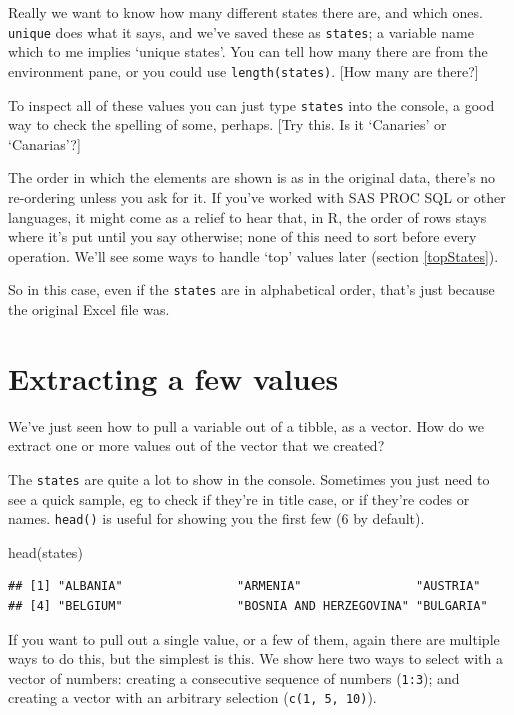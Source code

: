 \documentclass[
]{book}
\newenvironment{Shaded}{\begin{snugshade}}{\end{snugshade}}
\newcommand{\FunctionTok}[1]{\textcolor[rgb]{0.00,0.00,0.00}{#1}}
\newcommand{\NormalTok}[1]{#1}
\begin{document}
Really we want to know how many different states there are, and which ones. \texttt{unique} does what it says, and we've saved these as \texttt{states}; a variable name which to me implies `unique states'. You can tell how many there are from the environment pane, or you could use \texttt{length(states)}. {[}How many are there?{]}

To inspect all of these values you can just type \texttt{states} into the console, a good way to check the spelling of some, perhaps. {[}Try this. Is it `Canaries' or `Canarias'?{]}

The order in which the elements are shown is as in the original data, there's no re-ordering unless you ask for it. If you've worked with SAS PROC SQL or other languages, it might come as a relief to hear that, in R, the order of rows stays where it's put until you say otherwise; none of this need to sort before every operation. We'll see some ways to handle `top' values later (section \ref{topStates}).

So in this case, even if the \texttt{states} are in alphabetical order, that's just because the original Excel file was.

\hypertarget{someValues}{%
\section{Extracting a few values}\label{someValues}}

We've just seen how to pull a variable out of a tibble, as a vector. How do we extract one or more values out of the vector that we created?

The \texttt{states} are quite a lot to show in the console. Sometimes you just need to see a quick sample, eg to check if they're in title case, or if they're codes or names. \texttt{head()} is useful for showing you the first few (6 by default).

\begin{Shaded}
\begin{Highlighting}[]
\FunctionTok{head}\NormalTok{(states)}
\end{Highlighting}
\end{Shaded}

\begin{verbatim}
## [1] "ALBANIA"                "ARMENIA"                "AUSTRIA"               
## [4] "BELGIUM"                "BOSNIA AND HERZEGOVINA" "BULGARIA"
\end{verbatim}

If you want to pull out a single value, or a few of them, again there are multiple ways to do this, but the simplest is this. We show here two ways to select with a vector of numbers: creating a consecutive sequence of numbers (\texttt{1:3}); and creating a vector with an arbitrary selection (\texttt{c(1,\ 5,\ 10)}).
\end{document}

